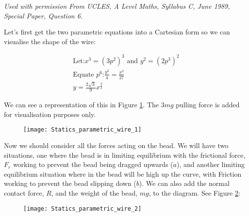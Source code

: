 \begin{problem}[A1989MsQ6l] %
{
{\textit{Used with permission From UCLES, A Level Maths, Syllabus C, June 1989, Special Paper, Question 6.}}
{
Let's first get the two parametric equations into a Cartesian form so we can visualise the shape of the wire:

\begin{eqnarray*}
\text{Let:} x^3 = (3p^2)^3 \text{ and } y^2 = (2p^3)^2 \\
\text{Equate $p^6$:} \frac{y^2}{4} = \frac{x^3}{27} \\
y = \frac{2\sqrt{3}}{9}x^{\frac{3}{2}} 
\end{eqnarray*}

 We can see a representation of this in Figure \ref{fig:Statics_parametric_wire_1}. The $3mg$ pulling force is added for visualisation purposes only.
 
 \begin{figure}[h]
	\centering
	\texttt{[image: Statics\_parametric\_wire\_1]}
	\caption{}	
	\label{fig:Statics_parametric_wire_1}
\end{figure}

Now we should consider all the forces acting on the bead. We will have two situations, one where the bead is in limiting equilibrium with the frictional force, $F_r$ working to prevent the bead being dragged upwards ($a$), and another limiting equilibrium situation where in the bead will be high up the curve, with Friction working to prevent the bead slipping down ($b$). We can also add the normal contact force, $R$, and the weight of the bead, $mg$, to the diagram. See Figure \ref{fig:Statics_parametric_wire_2}:

 \begin{figure}[h]
	\centering
	\texttt{[image: Statics\_parametric\_wire\_2]}
	\caption{}	
	\label{fig:Statics_parametric_wire_2}
\end{figure}

}}
\end{problem}
